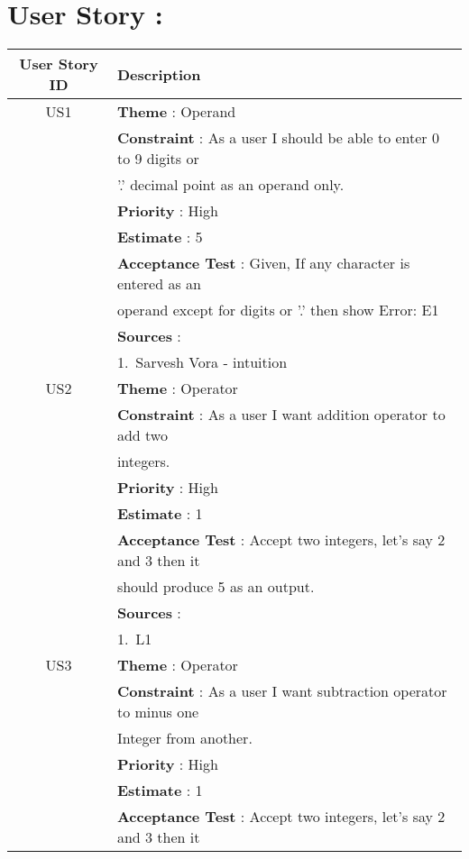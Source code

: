 \documentclass{article}
\begin{document}
\section{User Story : }
\begin{longtable}{|| c || l ||}
        \hline
        \hline
        \textbf{User Story ID} & \textbf{Description} \\
        \hline
        \hline
         US1 & \textbf{Theme} : Operand \\
         & \textbf{Constraint} : As a user I should be able to enter 0 to 9 digits or \\ & '.' decimal point as an operand only. \\ 
         & \textbf{Priority} : High \\
         & \textbf{Estimate} : 5 \\
         & \textbf{Acceptance Test} : Given, If any character is entered as an \\
         & operand except for digits or '.' then show Error: E1 \\
         & \textbf{Sources} : \\
         & 1.~Sarvesh Vora - intuition \\
         \hline
         US2 & \textbf{Theme} : Operator \\
         & \textbf{Constraint} : As a user I want addition operator to add two \\
         & integers. \\
         & \textbf{Priority} : High \\
         & \textbf{Estimate} : 1 \\
         & \textbf{Acceptance Test} : Accept two integers, let's say 2 and 3 then it \\
         & should produce 5 as an output. \\
         & \textbf{Sources} : \\
         & 1.~L1 \\
         \hline
         US3 & \textbf{Theme} : Operator \\
         & \textbf{Constraint} : As a user I want subtraction operator to minus one \\ 
         & Integer from another. \\
         & \textbf{Priority} : High \\
         & \textbf{Estimate} : 1 \\
         & \textbf{Acceptance Test} : Accept two integers, let's say 2 and 3 then it \\

\end{longtable}
\end{document}

